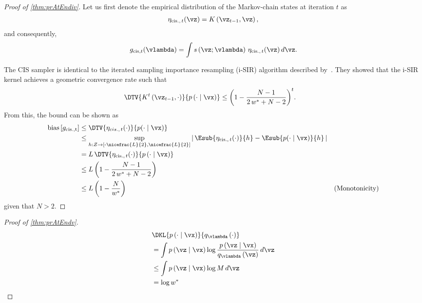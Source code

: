 \label{proofsection:prAtEndiv}\begin{proof}[Proof of \autoref{thm:prAtEndiv}]\label{proof:prAtEndiv}Let us first denote the empirical distribution of the Markov-chain states at iteration \(t\) as \begin {align} \eta _{\mathrm {cis.},\, t}(\vz ) = K\left (\vz _{t-1}, \vz \right ), \end {align} and consequently, \begin {align} g_{\mathrm {cis}, t}(\vlambda ) = \int s\left (\vz ; \vlambda \right ) \, \eta _{\mathrm {cis.},\, t}(\vz ) \, d\vz . \end {align} \par The CIS sampler is identical to the iterated sampling importance resampling (i-SIR) algorithm described by~\citet {andrieu_uniform_2018}. They showed that the i-SIR kernel achieves a geometric convergence rate such that \begin {align} \DTV {K^{t}\left (\vz _{t-1},\cdot \right )}{p\left (\cdot \mid \vx \right )} &\leq {\left (1 - \frac {N - 1}{2\,w^* + N - 2}\right )}^t. \end {align} From this, the bound can be shown as \begin {align} \mathrm {bias}\left [ g_{\mathrm {cis., t}} \right ] &\leq \DTV {\eta _{cis.,\, t}(\cdot )}{p(\cdot \mid \vx )} \\ &\leq \sup _{h : \mathcal {Z} \rightarrow \left [ \text {-}\nicefrac {L}{2}, \nicefrac {L}{2} \right ]} \left |\, \Esub {\eta _{\mathrm {cis.},\, t}(\cdot )}{h} - \Esub {p(\cdot \mid \vx )}{h} \,\right | \\ &= L \, \DTV { \eta _{\mathrm {cis.},\, t}(\cdot ) }{p\left (\cdot \mid \vx \right )} \\ &\leq L \, {\left (1 - \frac {N - 1}{2\,w^* + N - 2}\right )} \\ &\leq L \, {\left (1 - \frac {N}{w^*}\right )} &(\text {Monotonicity}) \end {align} given that \(N > 2\).\end{proof}
\prAtEndRestatev*
\label{proofsection:prAtEndv}\begin{proof}[Proof of \autoref{thm:prAtEndv}]\label{proof:prAtEndv}\begin {align} &\DKL {p\left (\cdot \mid \vx \right )}{ q_{\vlambda }\left (\cdot \right ) } \\ &= \int p\left (\vz \mid \vx \right ) \log \frac {p\left (\vz \mid \vx \right )}{q_{\vlambda }\left (\vz \right )}\,d\vz \\ &\leq \int p\left (\vz \mid \vx \right ) \log M \, d\vz \\ &= \log w^* \end {align}\end{proof}
